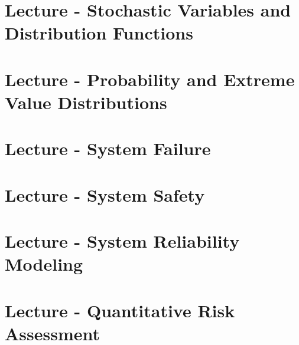 \documentclass[11pt]{article}
\begin{document}


\section{Lecture - Stochastic Variables and Distribution Functions}

\newpage
\section{Lecture - Probability and Extreme Value Distributions}

\newpage
\section{Lecture - System Failure}

\newpage
\section{Lecture - System Safety}

\newpage
\section{Lecture - System Reliability Modeling}

\newpage
\section{Lecture - Quantitative Risk Assessment}

\end{document}

